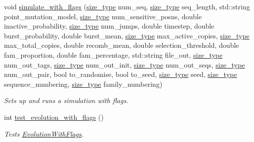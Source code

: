 \begin{DoxyCompactItemize}
void \hyperlink{namespaceretrocombinator_a3875c27225976a6e04bde555c3acca36}{simulate\+\_\+with\+\_\+flags} (\hyperlink{namespaceretrocombinator_a8e1541b50cee66a791df4c437ccbb385}{size\+\_\+type} num\+\_\+seq, \hyperlink{namespaceretrocombinator_a8e1541b50cee66a791df4c437ccbb385}{size\+\_\+type} seq\+\_\+length, std\+::string point\+\_\+mutation\+\_\+model, \hyperlink{namespaceretrocombinator_a8e1541b50cee66a791df4c437ccbb385}{size\+\_\+type} num\+\_\+sensitive\+\_\+posns, double inactive\+\_\+probability, \hyperlink{namespaceretrocombinator_a8e1541b50cee66a791df4c437ccbb385}{size\+\_\+type} num\+\_\+jumps, double timestep, double burst\+\_\+probability, double burst\+\_\+mean, \hyperlink{namespaceretrocombinator_a8e1541b50cee66a791df4c437ccbb385}{size\+\_\+type} max\+\_\+active\+\_\+copies, \hyperlink{namespaceretrocombinator_a8e1541b50cee66a791df4c437ccbb385}{size\+\_\+type} max\+\_\+total\+\_\+copies, double recomb\+\_\+mean, double selection\+\_\+threshold, double fam\+\_\+proportion, double fam\+\_\+percentage, std\+::string file\+\_\+out, \hyperlink{namespaceretrocombinator_a8e1541b50cee66a791df4c437ccbb385}{size\+\_\+type} num\+\_\+out\+\_\+tags, \hyperlink{namespaceretrocombinator_a8e1541b50cee66a791df4c437ccbb385}{size\+\_\+type} num\+\_\+out\+\_\+init, \hyperlink{namespaceretrocombinator_a8e1541b50cee66a791df4c437ccbb385}{size\+\_\+type} num\+\_\+out\+\_\+seqs, \hyperlink{namespaceretrocombinator_a8e1541b50cee66a791df4c437ccbb385}{size\+\_\+type} num\+\_\+out\+\_\+pair, bool to\+\_\+randomise, bool to\+\_\+seed, \hyperlink{namespaceretrocombinator_a8e1541b50cee66a791df4c437ccbb385}{size\+\_\+type} seed, \hyperlink{namespaceretrocombinator_a8e1541b50cee66a791df4c437ccbb385}{size\+\_\+type} sequence\+\_\+numbering, \hyperlink{namespaceretrocombinator_a8e1541b50cee66a791df4c437ccbb385}{size\+\_\+type} family\+\_\+numbering)
\begin{DoxyCompactList}\small\item\em Sets up and runs a simulation with flags. \end{DoxyCompactList}\item 
\mbox{\label{namespaceretrocombinator_a7900e3e3c62ac1f2231fee7a086225b7}} 
int \hyperlink{namespaceretrocombinator_a7900e3e3c62ac1f2231fee7a086225b7}{test\+\_\+evolution\+\_\+with\+\_\+flags} ()
\begin{DoxyCompactList}\small\item\em Tests \hyperlink{classretrocombinator_1_1EvolutionWithFlags}{Evolution\+With\+Flags}. \end{DoxyCompactList}\item 

\end{DoxyCompactItemize}
